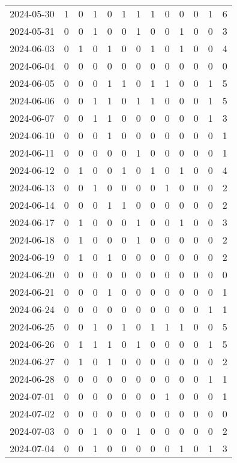 \documentclass[dvipdfmx,oneside]{article}
\begin{document}
\begin{longtable}{lcccccccccccc}
2024-05-30 & 1 & 0 & 1 & 0 & 1 & 1 & 1 & 0 & 0 & 0 & 1 & 6 \\
2024-05-31 & 0 & 0 & 1 & 0 & 0 & 1 & 0 & 0 & 1 & 0 & 0 & 3 \\
2024-06-03 & 0 & 1 & 0 & 1 & 0 & 0 & 1 & 0 & 1 & 0 & 0 & 4 \\
2024-06-04 & 0 & 0 & 0 & 0 & 0 & 0 & 0 & 0 & 0 & 0 & 0 & 0 \\
2024-06-05 & 0 & 0 & 0 & 1 & 1 & 0 & 1 & 1 & 0 & 0 & 1 & 5 \\
2024-06-06 & 0 & 0 & 1 & 1 & 0 & 1 & 1 & 0 & 0 & 0 & 1 & 5 \\
2024-06-07 & 0 & 0 & 1 & 1 & 0 & 0 & 0 & 0 & 0 & 0 & 1 & 3 \\
2024-06-10 & 0 & 0 & 0 & 1 & 0 & 0 & 0 & 0 & 0 & 0 & 0 & 1 \\
2024-06-11 & 0 & 0 & 0 & 0 & 0 & 1 & 0 & 0 & 0 & 0 & 0 & 1 \\
2024-06-12 & 0 & 1 & 0 & 0 & 1 & 0 & 1 & 0 & 1 & 0 & 0 & 4 \\
2024-06-13 & 0 & 0 & 1 & 0 & 0 & 0 & 0 & 1 & 0 & 0 & 0 & 2 \\
2024-06-14 & 0 & 0 & 0 & 1 & 1 & 0 & 0 & 0 & 0 & 0 & 0 & 2 \\
2024-06-17 & 0 & 1 & 0 & 0 & 0 & 1 & 0 & 0 & 1 & 0 & 0 & 3 \\
2024-06-18 & 0 & 1 & 0 & 0 & 0 & 1 & 0 & 0 & 0 & 0 & 0 & 2 \\
2024-06-19 & 0 & 1 & 0 & 1 & 0 & 0 & 0 & 0 & 0 & 0 & 0 & 2 \\
2024-06-20 & 0 & 0 & 0 & 0 & 0 & 0 & 0 & 0 & 0 & 0 & 0 & 0 \\
2024-06-21 & 0 & 0 & 0 & 1 & 0 & 0 & 0 & 0 & 0 & 0 & 0 & 1 \\
2024-06-24 & 0 & 0 & 0 & 0 & 0 & 0 & 0 & 0 & 0 & 0 & 1 & 1 \\
2024-06-25 & 0 & 0 & 1 & 0 & 1 & 0 & 1 & 1 & 1 & 0 & 0 & 5 \\
2024-06-26 & 0 & 1 & 1 & 1 & 0 & 1 & 0 & 0 & 0 & 0 & 1 & 5 \\
2024-06-27 & 0 & 1 & 0 & 1 & 0 & 0 & 0 & 0 & 0 & 0 & 0 & 2 \\
2024-06-28 & 0 & 0 & 0 & 0 & 0 & 0 & 0 & 0 & 0 & 0 & 1 & 1 \\
2024-07-01 & 0 & 0 & 0 & 0 & 0 & 0 & 0 & 1 & 0 & 0 & 0 & 1 \\
2024-07-02 & 0 & 0 & 0 & 0 & 0 & 0 & 0 & 0 & 0 & 0 & 0 & 0 \\
2024-07-03 & 0 & 0 & 1 & 0 & 0 & 1 & 0 & 0 & 0 & 0 & 0 & 2 \\
2024-07-04 & 0 & 0 & 1 & 0 & 0 & 0 & 0 & 0 & 1 & 0 & 1 & 3 \\

\end{longtable}
\end{document}
